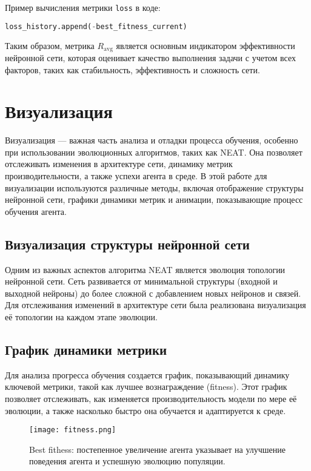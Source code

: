 \documentclass[a4paper,12pt]{article}
\begin{document}
Пример вычисления метрики \texttt{loss} в коде:

\begin{lstlisting}[language=Python]
    loss_history.append(-best_fitness_current)
\end{lstlisting}

Таким образом, метрика $R_{\text{avg}}$ является основным индикатором эффективности нейронной сети, которая оценивает качество выполнения задачи с учетом всех факторов, таких как стабильность, эффективность и сложность сети.

\newpage
\section{Визуализация}

Визуализация — важная часть анализа и отладки процесса обучения, особенно при использовании эволюционных алгоритмов, таких как NEAT. Она позволяет отслеживать изменения в архитектуре сети, динамику метрик производительности, а также успехи агента в среде. В этой работе для визуализации используются различные методы, включая отображение структуры нейронной сети, графики динамики метрик и анимации, показывающие процесс обучения агента.

\subsection{Визуализация структуры нейронной сети}

Одним из важных аспектов алгоритма NEAT является эволюция топологии нейронной сети. Сеть развивается от минимальной структуры (входной и выходной нейроны) до более сложной с добавлением новых нейронов и связей. Для отслеживания изменений в архитектуре сети была реализована визуализация её топологии на каждом этапе эволюции.

\subsection{График динамики метрики}

Для анализа прогресса обучения создается график, показывающий динамику ключевой метрики, такой как лучшее вознаграждение (fitness). Этот график позволяет отслеживать, как изменяется производительность модели по мере её эволюции, а также насколько быстро она обучается и адаптируется к среде.

\begin{figure}[H]
	\centering
	\texttt{[image: fitness.png]}
	\caption{Best fithess: постепенное увеличение агента указывает на улучшение поведения агента и успешную эволюцию популяции.}
	\label{fig:best_fitness}
\end{figure}
\end{document}
